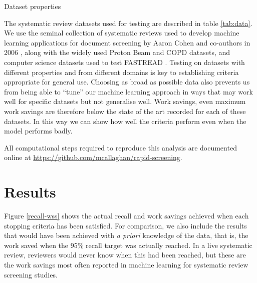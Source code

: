 \documentclass{bmcart}
\begin{document}
	
	\begin{table}
		
		\caption{Dataset properties}
		\label{tab:data}
	\end{table}
	
	The systematic review datasets used for testing are described in table \ref{tab:data}. We use the seminal collection of systematic reviews used to develop machine learning applications for document screening by Aaron Cohen and co-authors in 2006 \cite{Cohen2006}, along with the widely used Proton Beam \cite{Terasawa2009} and COPD \cite{Castaldi2009} datasets, and computer science datasets used to test FASTREAD \cite{Yu2019}. Testing on datasets with different properties and from different domains is key to establishing criteria appropriate for general use. Choosing as broad as possible data also prevents us from being able to ``tune'' our machine learning approach in ways that may work well for specific datasets but not generalise well. Work savings, even maximum work savings are therefore below the state of the art recorded for each of these datasets. In this way we can show how well the criteria perform even when the model performs badly.
	
	
	All computational steps required to reproduce this analysis are documented online at \url{https://github.com/mcallaghan/rapid-screening}.
	
	\section*{Results}
	
	Figure \ref{recall-wss} shows the actual recall and work savings achieved when each stopping criteria has been satisfied. 
	For comparison, we also include the results that would have been achieved with \textit{a priori} knowledge of the data, that is, the work saved when the 95\% recall target was actually reached. In a live systematic review, reviewers would never know when this had been reached, but these are the work savings most often reported in machine learning for systematic review screening studies.
	
\end{document}
